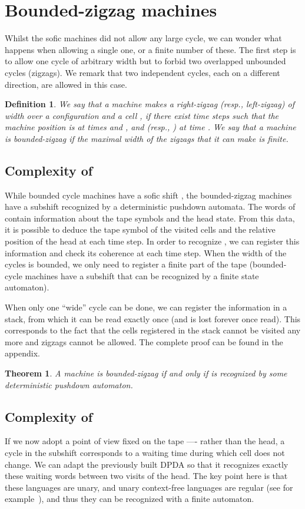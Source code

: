 \documentclass{llncs}
\newtheorem{teo}{Theorem}
\newtheorem{defi}{Definition}
\begin{document}
\section{Bounded-zigzag machines}
Whilst the sofic machines did not allow any large cycle, we can wonder what happens when allowing a single one, or a finite number of these.
The first step is to allow one cycle of arbitrary width but to forbid two overlapped unbounded cycles (zigzags).
We remark that two independent cycles, each on a different direction, are allowed in this case.
\begin{defi}
 We say that a machine makes a \emph{right-zigzag} (resp., \emph{left-zigzag}) of width  over a configuration  and a cell , if there exist time steps  such that the machine position is  at times  and , and  (resp., ) at time .
We say that a machine is \emph{bounded-zigzag} if the maximal width of the zigzags that it can make is finite.
\end{defi}
\subsection{Complexity of }
While bounded cycle machines have a sofic shift , the bounded-zigzag machines have a subshift recognized by a deterministic pushdown automata.
The words of  contain information about the tape symbols and the head state.
From this data, it is possible to deduce the tape symbol of the visited cells and the relative position of the head at each time step.
In order to recognize , we can register this information and check its coherence at each time step.
When the width of the cycles is bounded, we only need to register a finite part of the tape (bounded-cycle machines have a subshift that can be recognized by a finite state automaton).

When only one ``wide'' cycle can be done, we can register the information in a stack, from which it can be read exactly once (and is lost forever once read).
This corresponds to the fact that the cells registered in the stack cannot be visited any more and zigzags cannot be allowed. The complete proof can be found in the appendix.\begin{teo}\label{t:zigstack}
A machine  is bounded-zigzag if and only if  is recognized by some deterministic pushdown automaton.
\end{teo}
\subsection{Complexity of }
If we now adopt a point of view fixed on the tape ---- rather than the head, a cycle in the subshift corresponds to a waiting time during which cell  does not change.
We can adapt the previously built DPDA so that it recognizes exactly these waiting words between two visits of the head.
The key point here is that these languages are unary, and unary context-free languages are regular (see for example~\cite{Gins62}), and thus they can be recognized with a finite automaton.
\end{document}
